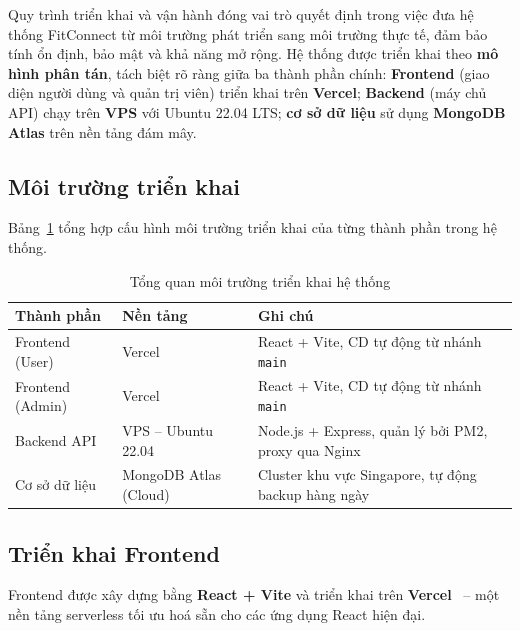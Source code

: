 Quy trình triển khai và vận hành đóng vai trò quyết định trong việc đưa hệ thống FitConnect từ môi trường phát triển sang môi trường thực tế, đảm bảo tính ổn định, bảo mật và khả năng mở rộng. Hệ thống được triển khai theo \textbf{mô hình phân tán}, tách biệt rõ ràng giữa ba thành phần chính: \textbf{Frontend} (giao diện người dùng và quản trị viên) triển khai trên \textbf{Vercel}; \textbf{Backend} (máy chủ API) chạy trên \textbf{VPS} với Ubuntu 22.04 LTS; \textbf{cơ sở dữ liệu} sử dụng \textbf{MongoDB Atlas} trên nền tảng đám mây.

\subsection{Môi trường triển khai}
\label{subsec:deploy_environment}

Bảng~\ref{tab:deploy_env} tổng hợp cấu hình môi trường triển khai của từng thành phần trong hệ thống.

\begin{table}[H]
\centering
\caption{Tổng quan môi trường triển khai hệ thống}
\label{tab:deploy_env}
\renewcommand{\arraystretch}{1.35}
\begin{tabular}{|p{3.2cm}|p{3.5cm}|p{7.8cm}|}
\hline
\textbf{Thành phần} & \textbf{Nền tảng} & \textbf{Ghi chú} \\
\hline
Frontend (User) & Vercel & React + Vite, CD tự động từ nhánh \texttt{main} \\
\hline
Frontend (Admin) & Vercel & React + Vite, CD tự động từ nhánh \texttt{main} \\
\hline
Backend API & VPS -- Ubuntu 22.04 & Node.js + Express, quản lý bởi PM2, proxy qua Nginx \\
\hline
Cơ sở dữ liệu & MongoDB Atlas (Cloud) & Cluster khu vực Singapore, tự động backup hàng ngày \\
\hline
\end{tabular}
\end{table}

\subsection{Triển khai Frontend}
\label{subsec:deploy_frontend}

Frontend được xây dựng bằng \textbf{React + Vite} và triển khai trên \textbf{Vercel}~\cite{VercelDocs} -- một nền tảng serverless tối ưu hoá sẵn cho các ứng dụng React hiện đại.

